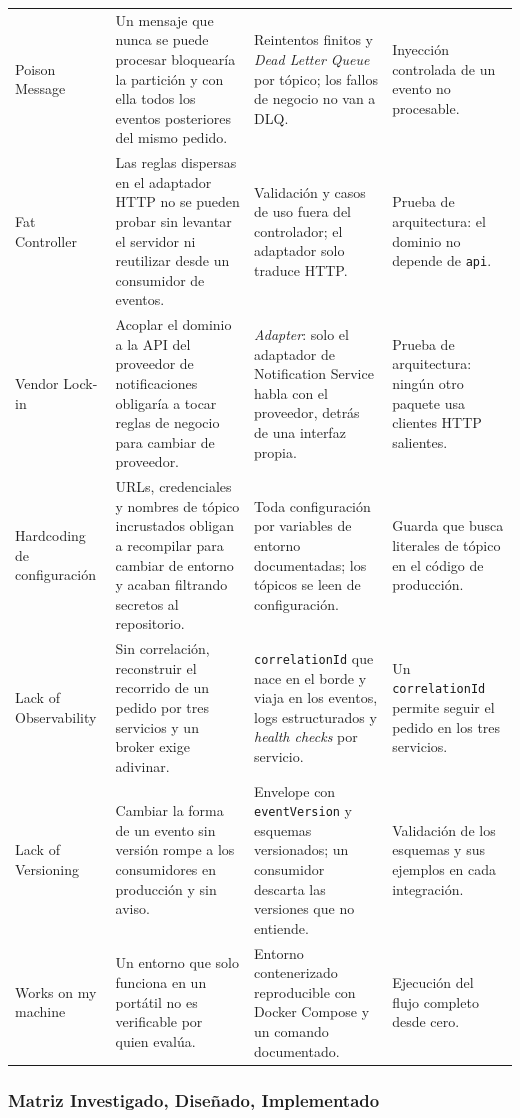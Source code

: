 \documentclass[12pt,a4paper]{article}
\begin{document}
\begin{longtable}{P{0.17\textwidth} P{0.26\textwidth} P{0.30\textwidth} P{0.17\textwidth}}
Poison Message & Un mensaje que nunca se puede procesar bloquearía la partición y con ella todos los eventos posteriores del mismo pedido. & Reintentos finitos y \textit{Dead Letter Queue} por tópico; los fallos de negocio no van a DLQ. & Inyección controlada de un evento no procesable. \\
Fat Controller & Las reglas dispersas en el adaptador HTTP no se pueden probar sin levantar el servidor ni reutilizar desde un consumidor de eventos. & Validación y casos de uso fuera del controlador; el adaptador solo traduce HTTP. & Prueba de arquitectura: el dominio no depende de \texttt{api}. \\
Vendor Lock-in & Acoplar el dominio a la API del proveedor de notificaciones obligaría a tocar reglas de negocio para cambiar de proveedor. & \textit{Adapter}: solo el adaptador de Notification Service habla con el proveedor, detrás de una interfaz propia. & Prueba de arquitectura: ningún otro paquete usa clientes HTTP salientes. \\
Hardcoding de configuración & URLs, credenciales y nombres de tópico incrustados obligan a recompilar para cambiar de entorno y acaban filtrando secretos al repositorio. & Toda configuración por variables de entorno documentadas; los tópicos se leen de configuración. & Guarda que busca literales de tópico en el código de producción. \\
Lack of Observability & Sin correlación, reconstruir el recorrido de un pedido por tres servicios y un broker exige adivinar. & \texttt{correlationId} que nace en el borde y viaja en los eventos, logs estructurados y \textit{health checks} por servicio. & Un \texttt{correlationId} permite seguir el pedido en los tres servicios. \\
Lack of Versioning & Cambiar la forma de un evento sin versión rompe a los consumidores en producción y sin aviso. & Envelope con \texttt{eventVersion} y esquemas versionados; un consumidor descarta las versiones que no entiende. & Validación de los esquemas y sus ejemplos en cada integración. \\
Works on my machine & Un entorno que solo funciona en un portátil no es verificable por quien evalúa. & Entorno contenerizado reproducible con Docker Compose y un comando documentado. & Ejecución del flujo completo desde cero. \\
\bottomrule
\end{longtable}
\setlength{\tabcolsep}{6pt}
\normalsize

\subsubsection{Matriz Investigado, Diseñado, Implementado}
\end{document}
